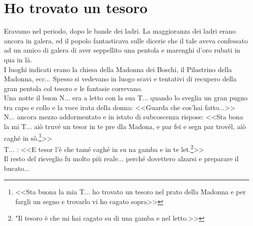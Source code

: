 
\chapter{Ho trovato un tesoro}

Eravamo nel periodo, dopo le bande dei ladri. La maggioranza dei ladri erano ancora in galera, ed il popolo fantasticava sulle dicerie che il tale aveva confessato ad un amico di galera di aver seppellito una pentola e marenghi d'oro rubati in qua in là.\\
\indent I luoghi indicati erano la chiesa della Madonna dei Boschi, il Pilastrino della Madonna, ecc... Spesso si vedevano in luogo scavi e tentativi di recupero della gran pentola col tesoro e le fantasie correvano.\\
\indent Una notte il buon N\:.\:.\:. era a letto con la sua T\:.\:.\:. quando lo sveglia un gran pugno tra capo e collo e la voce irata della donna: <<Guarda che cos'hai fatto...>>\\
\indent {}N\:.\:.\:. ancora mezzo addormentato e in istato di subcoscenza rispose: <<Sta bona la mi T\:.\:.\:. aiò truvé un tesor in te pre dla Madona, e par fei e segn par trovél, aiò caghé in sò.\footnote{<<Sta buona la mia T\:.\:.\:. ho trovato un tesoro nel prato della Madonna e per fargli un segno e trovarlo vi ho cagato sopra>>}>>\\
\indent {}T\:.\:.\:. : <<E tesor l'è che tamé caghé  in su na gamba e in te let.\footnote{"Il tesoro è che mi hai cagato su di una gamba e nel letto.>>}>>\\
\indent Il resto del risveglio fu molto più reale... perché dovettero alzarsi e preparare il bucato...


\begin{figure}[hbt]%
	\vspace{-1cm}
    \centering
	\vspace{-0.2cm}
\end{figure}